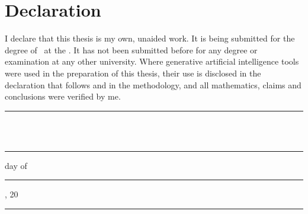 \chapter*{Declaration}
I declare that this thesis is my own, unaided work. It is being submitted for the degree of \Degree\ at the \Institution. It has not been submitted before for any degree or examination at any other university. Where generative artificial intelligence tools were used in the preparation of this thesis, their use is disclosed in the declaration that follows and in the methodology, and all mathematics, claims and conclusions were verified by me.
\vspace{2cm}\par\noindent\rule{6cm}{0.4pt}\\ \Author\\[6pt] \rule{4cm}{0.4pt} day of \rule{4cm}{0.4pt}, 20\rule{1cm}{0.4pt}
